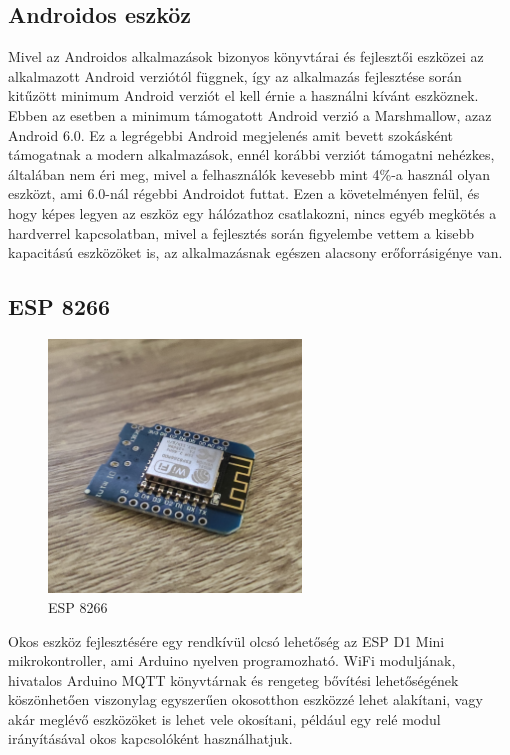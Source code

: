 \documentclass[]{thesis-ekf}
\theoremstyle{definition}
\theoremstyle{remark}
\begin{document}
\subsection{Androidos eszköz}
Mivel az Androidos alkalmazások bizonyos könyvtárai és fejlesztői eszközei az alkalmazott Android verziótól függnek, 
így az alkalmazás fejlesztése során kitűzött minimum Android verziót el kell érnie a használni kívánt eszköznek. 
Ebben az esetben a minimum támogatott Android verzió a Marshmallow, azaz Android 6.0. Ez a legrégebbi Android megjelenés 
amit bevett szokásként támogatnak a modern alkalmazások, ennél korábbi verziót támogatni nehézkes, általában nem éri meg, mivel
a felhasználók kevesebb mint 4\%-a használ olyan eszközt, ami 6.0-nál régebbi Androidot futtat\cite{android-versions}.
Ezen a követelményen felül, és hogy képes legyen az eszköz egy hálózathoz csatlakozni, nincs egyéb megkötés a hardverrel
kapcsolatban, mivel a fejlesztés során figyelembe vettem a kisebb kapacitású eszközöket is, az alkalmazásnak
egészen alacsony erőforrásigénye van.

\subsection{ESP 8266}

\begin{figure}[ht]
	\centering
	\includegraphics[width=0.6\textwidth]{images/esp.png}
	\caption{ESP 8266}
\end{figure}

Okos eszköz fejlesztésére egy rendkívül olcsó lehetőség az ESP D1 Mini mikrokontroller, ami Arduino nyelven
programozható. WiFi moduljának, hivatalos Arduino MQTT könyvtárnak és rengeteg bővítési lehetőségének
köszönhetően viszonylag egyszerűen okosotthon eszközzé lehet alakítani, vagy akár meglévő eszközöket
is lehet vele okosítani, például egy relé modul irányításával okos kapcsolóként használhatjuk.
\end{document}
